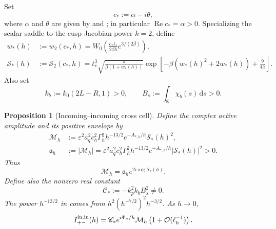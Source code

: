 \documentclass[11pt]{article}
\newtheorem{proposition}[theorem]{Proposition}
\newcommand{\R}{\mathbb R}
\newcommand{\eps}{\varepsilon}
\newcommand{\dd}{\,\mathrm d}
\newcommand{\cO}{\mathcal O}
\newcommand{\Rea}{\operatorname{Re}}
\begin{document}
Set
\begin{equation}\label{eq:c-star-def}
 c_*:=\alpha-i\theta,
\end{equation}
where $\alpha$ and $\theta$ are given by
 and ; in particular $\Rea c_*=\alpha>0$.
Specializing the scalar saddle to the cusp Jacobian power $k=2$, define
\begin{align}
 w_*(h)&:=w_2(c_*,h)
 =W_0\!\left(
 \frac{c_*t_*}{2\beta h}e^{3/(2\beta)}\right),
 \label{eq:w-star}\\
 \mathcal S_*(h)&:=\mathcal S_2(c_*,h)
 =t_*^3\sqrt{\frac{\pi}{\beta(1+w_*(h))}}
 \exp\!\left[-\beta(w_*(h)^2+2w_*(h))
 +\frac{9}{4\beta}\right].
 \label{eq:Q-star}
\end{align}
Also set
\begin{equation}\label{eq:kb-Bs}
 k_b:=k_0(2L-R,1)>0,
 \qquad
 B_s:=\int_{\R}\chi_b(s)\dd s>0.
\end{equation}

\begin{proposition}[Incoming--incoming cross cell]
\label{prop:incoming-cross-cell}
Define the complex active amplitude and its positive envelope by
\begin{align}
 \mathcal M_h
 &:=\eps^2a_q^2c_h^2\Gamma_h^2h^{-13/2}
 e^{-A_{*,h}/h}\mathcal S_*(h)^2,
 \label{eq:active-complex-amplitude}\\
 \mathfrak a_h&:=|\mathcal M_h|
 =\eps^2a_q^2c_h^2\Gamma_h^2h^{-13/2}
 e^{-A_{*,h}/h}|\mathcal S_*(h)|^2>0.
 \label{eq:active-envelope}
\end{align}
Thus
\begin{equation}\label{eq:M-phase}
 \mathcal M_h=\mathfrak a_h e^{2i\arg\mathcal S_*(h)}.
\end{equation}
Define also the nonzero real constant
\begin{equation}\label{eq:C-star}
 \mathscr C_*:=-k_p^2k_bB_s^2\ne0.
\end{equation}
The power $h^{-13/2}$ in  comes from
$h^2(h^{-7/2})^2h^{-3/2}$.  As $h\to0$,
\begin{equation}\label{eq:incoming-cell-asymptotic}
 I_{+-}^{\rm in,in}(h)
 =\mathscr C_*e^{i\Phi_*/h}\mathcal M_h
 \left(1+\cO(\ell_h^{-1})\right).
\end{equation}
\end{proposition}
\end{document}
